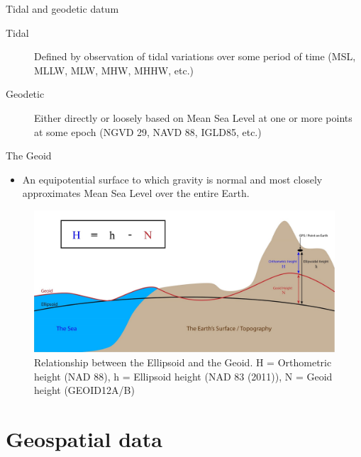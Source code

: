 \documentclass[11pt,dvipsnames,ignorenonframetext,aspectratio=169]{beamer}
\providecommand{\tightlist}{%
  \setlength{\itemsep}{0pt}\setlength{\parskip}{0pt}}
\begin{document}
\begin{frame}{Tidal and geodetic datum}
\protect\hypertarget{tidal-and-geodetic-datum}{}
\begin{description}
\item[Tidal] Defined by observation of tidal variations over some period of time (MSL, MLLW, MLW, MHW, MHHW, etc.)
\item[Geodetic] Either directly or loosely based on Mean Sea Level at one or more points at some epoch (NGVD 29, NAVD 88, IGLD85, etc.)
\end{description}
\end{frame}

\begin{frame}{The Geoid}
\protect\hypertarget{the-geoid}{}
\begin{itemize}
\tightlist
\item
  An equipotential surface to which gravity is normal and most closely
  approximates Mean Sea Level over the entire Earth.
\end{itemize}

\begin{figure}
\includegraphics[width=0.7\linewidth]{../images/geoid-ellipsoid-relationship} \caption{Relationship between the Ellipsoid and the Geoid. H = Orthometric height (NAD 88), h = Ellipsoid height (NAD 83 (2011)), N = Geoid height (GEOID12A/B)}\label{fig:geoid-ellipsoid-relationship}
\end{figure}
\end{frame}

\hypertarget{geospatial-data}{%
\section{Geospatial data}\label{geospatial-data}}
\end{document}

